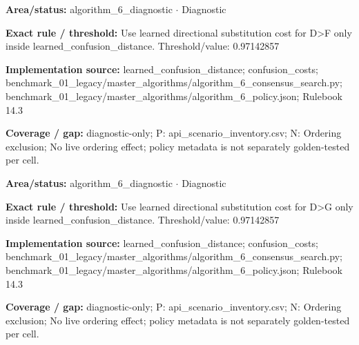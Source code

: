 \begin{tcolorbox}[enhanced,breakable,colback=white,colframe=Muted!45,boxrule=0.45pt,arc=1.5pt,left=6pt,right=6pt,top=5pt,bottom=5pt,title={\texttt{A6-LEARNED-SUBSTITUTION-D-F}},title after break={\texttt{A6-LEARNED-SUBSTITUTION-D-F}\ (continued)},fonttitle=\headingfont\bfseries\color{Navy},coltitle=Navy]
\textbf{Area/status:} algorithm\_\allowbreak{}6\_\allowbreak{}diagnostic $\boldsymbol{\cdot}$ Diagnostic\par
\smallskip
\textbf{Exact rule / threshold:} Use learned directional substitution cost for D>F only inside learned\_\allowbreak{}confusion\_\allowbreak{}distance. Threshold/\allowbreak{}value: 0.97142857\par
\smallskip
\textbf{Implementation source:} learned\_\allowbreak{}confusion\_\allowbreak{}distance; confusion\_\allowbreak{}costs; benchmark\_\allowbreak{}01\_\allowbreak{}legacy/\allowbreak{}master\_\allowbreak{}algorithms/\allowbreak{}algorithm\_\allowbreak{}6\_\allowbreak{}consensus\_\allowbreak{}search.py; benchmark\_\allowbreak{}01\_\allowbreak{}legacy/\allowbreak{}master\_\allowbreak{}algorithms/\allowbreak{}algorithm\_\allowbreak{}6\_\allowbreak{}policy.json; Rulebook 14.3\par
\smallskip
\textbf{Coverage / gap:} diagnostic-only; P: api\_\allowbreak{}scenario\_\allowbreak{}inventory.csv; N: Ordering exclusion; No live ordering effect; policy metadata is not separately golden-tested per cell.
\end{tcolorbox}
\begin{tcolorbox}[enhanced,breakable,colback=white,colframe=Muted!45,boxrule=0.45pt,arc=1.5pt,left=6pt,right=6pt,top=5pt,bottom=5pt,title={\texttt{A6-LEARNED-SUBSTITUTION-D-G}},title after break={\texttt{A6-LEARNED-SUBSTITUTION-D-G}\ (continued)},fonttitle=\headingfont\bfseries\color{Navy},coltitle=Navy]
\textbf{Area/status:} algorithm\_\allowbreak{}6\_\allowbreak{}diagnostic $\boldsymbol{\cdot}$ Diagnostic\par
\smallskip
\textbf{Exact rule / threshold:} Use learned directional substitution cost for D>G only inside learned\_\allowbreak{}confusion\_\allowbreak{}distance. Threshold/\allowbreak{}value: 0.97142857\par
\smallskip
\textbf{Implementation source:} learned\_\allowbreak{}confusion\_\allowbreak{}distance; confusion\_\allowbreak{}costs; benchmark\_\allowbreak{}01\_\allowbreak{}legacy/\allowbreak{}master\_\allowbreak{}algorithms/\allowbreak{}algorithm\_\allowbreak{}6\_\allowbreak{}consensus\_\allowbreak{}search.py; benchmark\_\allowbreak{}01\_\allowbreak{}legacy/\allowbreak{}master\_\allowbreak{}algorithms/\allowbreak{}algorithm\_\allowbreak{}6\_\allowbreak{}policy.json; Rulebook 14.3\par
\smallskip
\textbf{Coverage / gap:} diagnostic-only; P: api\_\allowbreak{}scenario\_\allowbreak{}inventory.csv; N: Ordering exclusion; No live ordering effect; policy metadata is not separately golden-tested per cell.
\end{tcolorbox}

